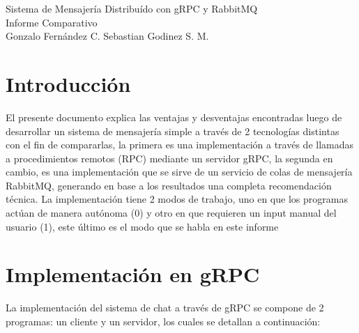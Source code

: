 \documentclass[11pt, letter]{article}
\begin{document}
\begin{center}
	\huge{Sistema de Mensajería Distribuído con gRPC y RabbitMQ}\\
	\LARGE{Informe Comparativo}\\
	\vspace{3mm}
	\large{Gonzalo Fernández C. \hspace{6mm} Sebastian Godinez S. M.}

\end{center}

\section{Introducción}

El presente documento explica las ventajas y desventajas encontradas luego de desarrollar un sistema de mensajería simple a través de 2 tecnologías distintas con el fin de compararlas, la primera es una implementación a través de llamadas a procedimientos remotos (RPC) mediante un servidor gRPC\cite{GRPC}, la segunda en cambio, es una implementación que se sirve de un servicio de colas de mensajería RabbitMQ\cite{RabbitMQ}, generando en base a los resultados una completa recomendación técnica. La implementación tiene 2 modos de trabajo, uno en que los programas actúan de manera autónoma (0) y otro en que requieren un input manual del usuario (1), este último es el modo que se habla en este informe

\section{Implementación en gRPC}

La implementación del sistema de chat a través de gRPC se compone de 2 programas: un cliente y un servidor, los cuales se detallan a continuación:
\end{document}
